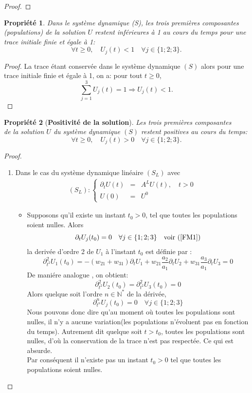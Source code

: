 \documentclass[12pt,a4paper,openany,oneside]{book}
\newtheorem{property}{Propriété}[chapter]
\begin{document}
{{{{{{\begin{proof}
\end{proof}

\begin{property}
Dans le système dynamique (S), les trois premières composantes\\(populations) de la solution $ U $ restent inférieures à 1 au cours du temps pour une trace initiale finie et égale à 1:
$$\forall t\geq 0, \quad U_{j}(t)< 1 \quad \forall j\in \{1;2;3\} .$$
\end {property}

\begin{proof}
La trace étant conservée dans le système dynamique $(S)$ alors pour une trace initiale finie et égale à 1, on a: pour tout $ t\geq 0 $, 
$$ \sum_{j=1}^{3}U_{j}(t)= 1\Rightarrow U_{j}(t)< 1 .$$

\end{proof}

\begin{property}[\textbf{Positivité de la solution}]
Les trois premières composantes\\de la solution $ U $ du système dynamique $(S)$  restent positives au cours du temps:
$$\forall t\geq 0, \quad U_{j}(t)>0 \quad \forall j\in \{1;2;3\} .$$
\end {property}
%
\begin{proof}

\begin{enumerate}
\item Dans le cas du système dynamique  linéaire $(S_{L})$ avec
\begin{eqnarray*}
(S_{L}):\left\{\begin{array}{lll}
\partial_{t}U(t) & = & A^{L}U(t),\quad t>0\\
U(0) & = & U^{0}
\end{array}\right.
\end{eqnarray*}
%
\begin{itemize}[label=$\bullet$]
\item  Supposons qu'il existe un instant $t_{0}>0$, tel que toutes les populations soient nulles.
Alors $$\partial_{t}U_{j}(t_{0})=0 \quad \forall j\in \{1;2;3\} \quad \textrm{voir (\ref{FM1})} $$
la derivée d'ordre 2 de $ U_{1}$ à l'instant $t_{0}$ est définie par :
$$ \partial_{t^{2}}^{2}U_{1}(t_{0}) = -(w_{21} + w_{31})\partial_{t}U_{1} + w_{21}\dfrac{a_{2}}{a_{1}}\partial_{t}U_{2}+ w_{31}\dfrac{a_{3}}{a_{1}}\partial_{t}U_{3}=0 $$
De maniére analogue , on obtient: 
$$ \partial_{t^{2}}^{2}U_{2}(t_{0}) =\partial_{t^{2}}^{2}U_{3}(t_{0}) = 0 $$
%
Alors quelque soit l'ordre $n \in \mathbb{N^{*}}$ de la dérivée, 
$$ \partial_{t^{n}}^{n}U_{j}(t_{0}) = 0 \quad \forall j\in \{1;2;3\}$$
Nous pouvons donc dire qu'au moment où toutes les populations sont nulles, il n'y a aucune variation(les populations n'évoluent pas en fonction du temps). Autrement dit quelque soit $t>t_{0}$, toutes les populations sont nulles, d'où la conservation de la trace n'est pas respectée. Ce qui est absurde.\\
Par conséquent il n'existe pas un instant $t_{0}>0$ tel que toutes les populations soient nulles.


\end{itemize}
\end{enumerate}
\end{proof}}}}}}}
\end{document}
